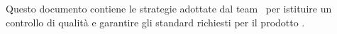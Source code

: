Questo documento contiene le strategie adottate dal team \gruppo\ per istituire un controllo di qualità e garantire gli standard richiesti per il prodotto \progetto.